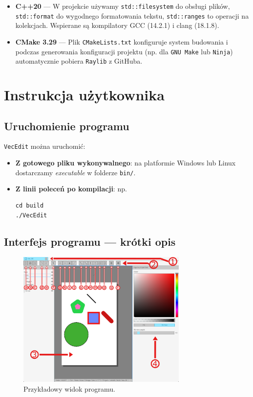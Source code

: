 \documentclass[a4paper,12pt]{article}
\begin{document}
\begin{itemize}
    \item \textbf{C++20} — W projekcie używamy \texttt{std::filesystem} do
      obsługi plików, \texttt{std::format} do wygodnego formatowania tekstu,
      \texttt{std::ranges} to operacji na kolekcjach. Wspierane są kompilatory
      GCC (14.2.1) i clang (18.1.8).

    \item \textbf{CMake 3.29} — Plik \texttt{CMakeLists.txt} konfiguruje system
      budowania i podczas generowania konfiguracji projektu (np. dla
      \texttt{GNU Make} lub \texttt{Ninja}) automatycznie pobiera
      \texttt{Raylib} z GitHuba.
\end{itemize}

\section{Instrukcja użytkownika}

\subsection{Uruchomienie programu}
\texttt{VecEdit} można uruchomić:
\begin{itemize}
    \item \textbf{Z gotowego pliku wykonywalnego}: na platformie Windows lub Linux
    dostarczamy \emph{executable} w folderze \texttt{bin/}.
    \item \textbf{Z linii poleceń po kompilacji}: np.
\begin{verbatim}
cd build
./VecEdit
\end{verbatim}
\end{itemize}

\subsection{Interfejs programu — krótki opis}

\begin{figure}[h!]
    \centering
    \includegraphics[width=0.75\textwidth]{./vecedit_screenshot.png}
    \caption{Przykładowy widok programu.}
    \label{fig:screenshot}
\end{figure}
\end{document}
